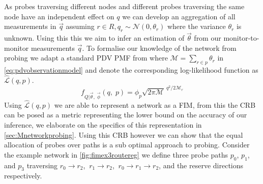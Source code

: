 As probes traversing different nodes and different probes traversing the same node have an independent effect on $q$ we can develop an aggregation of all measurements in $\vec{q}$ assuming $r\in R, q_r \sim \mathcal{N}(0, \theta_r)$ where the variance $\theta_r$ is unknown. Using this this we aim to infer an estimation of $\vec{\theta}$ from our monitor-to-monitor measurements $\vec{q}$. To formalise our knowledge of the network from probing we adapt a standard PDV PMF from \cite{he_network_2021} where $\mathcal{M} = \sum_{r\in p}\theta_r$ in \cref{eq:pdvobservationmodel} and denote the corresponding log-likelihood function as $\widehat{\mathcal{L}}(q, p)$.
\begin{equation}
\label{eq:pdvobservationmodel}
    f_{Q|\vec{\theta},\; \vec{\phi}}(q,\;p) = \phi_p \sqrt{2\pi\mathcal{M}}^{\ q^2/{2\mathcal{M}_r}}
\end{equation}
Using $\widehat{\mathcal{L}}(q, p)$ we are able to represent a network as a FIM, from this the CRB can be posed as a metric representing the lower bound on the accuracy of our inference, we elaborate on the specifics of this representation in \cref{sec:Mnetworkprobing}. Using this CRB however we can show that the equal allocation of probes over paths is a sub optimal approach to probing. Consider the example network in \cref{fig:fimex3routereg} we define three probe paths $p_0$, $p_1$, and $p_3$ traversing $r_0\rightarrow r_2$, $\ r_1\rightarrow r_2$, $\ r_0\rightarrow r_1\rightarrow r_2$, and the reserve directions respectively.
